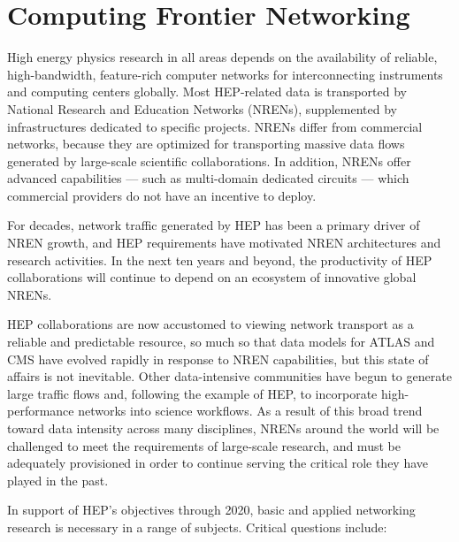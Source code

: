 \section{Computing Frontier Networking}


High energy physics research in all areas depends on the availability of reliable, high-bandwidth, feature-rich computer networks for interconnecting instruments and computing centers globally. Most HEP-related data is transported by National Research and Education Networks (NRENs), supplemented by infrastructures dedicated to specific projects. NRENs differ from commercial networks, because they are optimized for transporting massive data flows generated by large-scale scientific collaborations. In addition, NRENs offer advanced capabilities --- such as multi-domain dedicated circuits --- which commercial providers do not have an incentive to deploy.

For decades, network traffic generated by HEP has been a primary driver of NREN growth, and HEP requirements have motivated NREN architectures and research activities. In the next ten years and beyond, the productivity of HEP collaborations will continue to depend on an ecosystem of innovative global NRENs. 

HEP collaborations are now accustomed to viewing network transport as a reliable and predictable resource,  so much so that data models for ATLAS and CMS have evolved rapidly in response to NREN capabilities, but this state of affairs is not inevitable. Other data-intensive communities have begun to generate large traffic flows and, following the example of HEP, to incorporate high-performance networks into science workflows. As a result of this broad trend toward data intensity across many disciplines, NRENs around the world will be challenged to meet the requirements of large-scale research, and must be adequately provisioned in order to continue serving the critical role they have played in the past.  

In support of HEP’s objectives through 2020, basic and applied networking research is necessary in a range of subjects. Critical questions include: 

